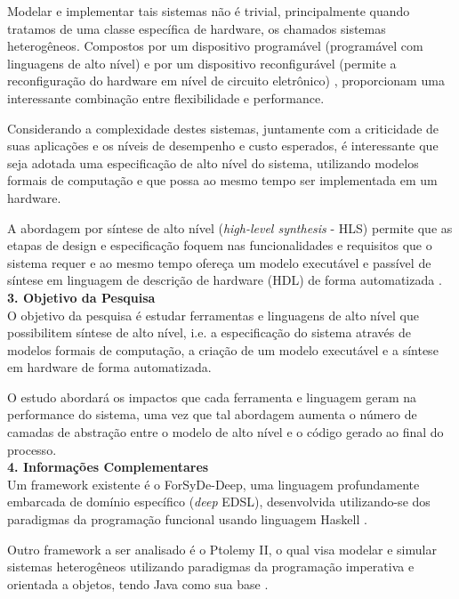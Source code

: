 \noindent
Modelar e implementar tais sistemas não é trivial, principalmente quando tratamos de uma classe específica de hardware, os chamados sistemas heterogêneos. Compostos por um dispositivo programável (programável com linguagens de alto nível) e por um dispositivo reconfigurável (permite a reconfiguração do hardware em nível de circuito eletrônico) \cite{Loubach2016a}, proporcionam uma interessante combinação entre flexibilidade e performance.

\noindent
Considerando a complexidade destes sistemas, juntamente com a criticidade de suas aplicações e os níveis de desempenho e custo esperados, é interessante que seja adotada uma especificação de alto nível do sistema, utilizando modelos formais de computação e que possa ao mesmo tempo ser implementada em um hardware.

\noindent
A abordagem por síntese de alto nível (\emph{high-level synthesis} - HLS) permite que as etapas de design e especificação foquem nas funcionalidades e requisitos que o sistema requer e ao mesmo tempo ofereça um modelo executável e passível de síntese em linguagem de descrição de hardware (HDL) de forma automatizada \cite{Loubach2022a}.\\

\noindent
\textbf{3. Objetivo da Pesquisa}\\
\noindent
O objetivo da pesquisa é estudar ferramentas e linguagens de alto nível que possibilitem síntese de alto nível, i.e. a especificação do sistema através de modelos formais de computação, a criação de um modelo executável e a síntese em hardware de forma automatizada.

\noindent
O estudo abordará os impactos que cada ferramenta e linguagem geram na performance do sistema, uma vez que tal abordagem aumenta o número de camadas de abstração entre o modelo de alto nível e o código gerado ao final do processo.\\

\noindent
\textbf{4. Informações Complementares}\\
\noindent
Um framework existente é o ForSyDe-Deep, uma linguagem profundamente embarcada de domínio específico (\emph{deep} EDSL), desenvolvida utilizando-se dos paradigmas da programação funcional usando linguagem Haskell \cite{Loubach2022a}\cite{ForSyDe-Deep}.

\noindent
Outro framework a ser analisado é o Ptolemy II, o qual visa modelar e simular sistemas heterogêneos utilizando paradigmas da programação imperativa e orientada a objetos, tendo Java como sua base \cite{PtolemyII}.\\

